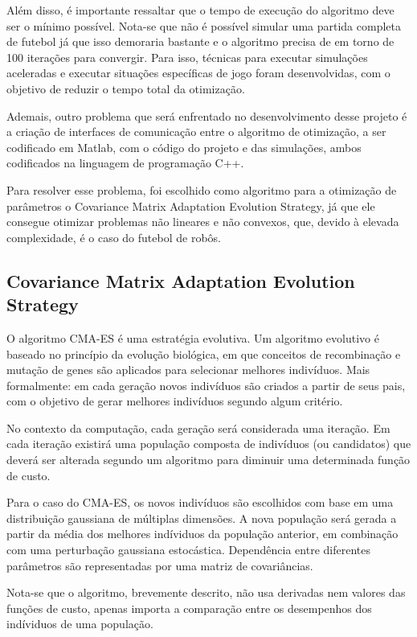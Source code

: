 \documentclass[a4paper,12pt]{article}
\begin{document}
Além disso, é importante ressaltar que o tempo de execução do algoritmo deve ser o mínimo possível. Nota-se que não é possível simular uma partida completa de futebol já que isso demoraria bastante e o algoritmo precisa de em torno de 100 iterações para convergir. Para isso, técnicas para executar simulações aceleradas e executar situações específicas de jogo foram desenvolvidas, com o objetivo de reduzir o tempo total da otimização.

Ademais, outro problema que será enfrentado no desenvolvimento desse projeto é a criação de interfaces de comunicação entre o algoritmo de otimização, a ser codificado em Matlab, com o código do projeto e das simulações, ambos codificados na linguagem de programação C++.

Para resolver esse problema, foi escolhido como algoritmo para a otimização de parâmetros o Covariance Matrix Adaptation Evolution Strategy, já que ele consegue otimizar problemas não lineares e não convexos, que, devido à elevada complexidade, é o caso do futebol de robôs.

\subsection{Covariance Matrix Adaptation Evolution Strategy}

O algoritmo CMA-ES é uma estratégia evolutiva. Um algoritmo evolutivo é baseado no princípio da evolução biológica, em que conceitos de recombinação e mutação de genes são aplicados para selecionar melhores indivíduos. Mais formalmente: em cada geração novos indivíduos são criados a partir de seus pais, com o objetivo de gerar melhores indivíduos segundo algum critério.

No contexto da computação, cada geração será considerada uma iteração. Em cada iteração existirá uma população composta de indivíduos (ou candidatos) que deverá ser alterada segundo um algoritmo para diminuir uma determinada função de custo. 

Para o caso do CMA-ES, os novos indivíduos são escolhidos com base em uma distribuição gaussiana de múltiplas dimensões. A nova população será gerada a partir da média dos melhores indíviduos da população anterior, em combinação com uma perturbação gaussiana estocástica. Dependência entre diferentes parâmetros são representadas por uma matriz de covariâncias.

Nota-se que o algoritmo, brevemente descrito, não usa derivadas nem valores das funções de custo, apenas importa a comparação entre os desempenhos dos indíviduos de uma população.
\end{document}
